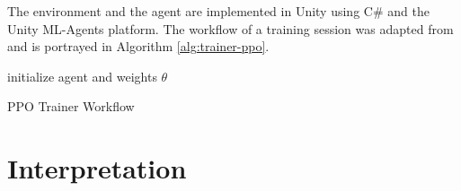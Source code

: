 The environment and the agent are implemented in Unity using C\# and the Unity ML-Agents platform. 
The workflow of a training session was adapted from \cite{eriksson2021deep} and is portrayed in Algorithm \ref{alg:trainer-ppo}.

{\centering
\begin{minipage}{.8\linewidth}
    \begin{algorithm}[H]
        initialize agent and weights $\theta$\;
      
        \caption{PPO Trainer Workflow} \label{alg:trainer-ppo}
    \end{algorithm}
\end{minipage}
\par
}


\section{Interpretation}\label{chap:3:interpretation}

